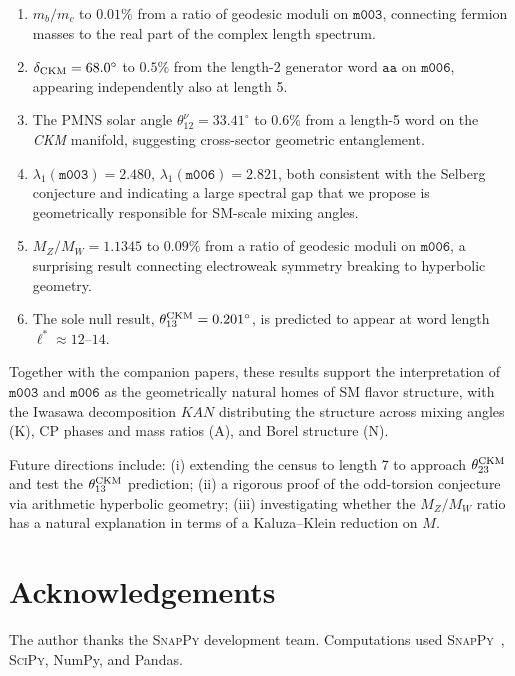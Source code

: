 \documentclass[11pt,a4paper]{article}
\newcommand{\mfld}[1]{\texttt{#1}}
\newcommand{\word}[1]{\texttt{#1}}
\newcommand{\degr}{^{\circ}}
\begin{document}
\begin{enumerate}
\item $m_b/m_c$ to $0.01\%$ from a ratio of geodesic moduli on $\mfld{m003}$,
      connecting fermion masses to the real part of the complex length spectrum.
\item $\delta_{\rm CKM}=68.0\degr$ to $0.5\%$ from the length-2 generator word
      $\word{aa}$ on $\mfld{m006}$, appearing independently also at length 5.
\item The PMNS solar angle $\theta_{12}^\nu=33.41\degr$ to $0.6\%$ from a
      length-5 word on the \emph{CKM} manifold, suggesting cross-sector
      geometric entanglement.
\item $\lambda_1(\mfld{m003})=2.480$, $\lambda_1(\mfld{m006})=2.821$,
      both consistent with the Selberg conjecture and indicating a large
      spectral gap that we propose is geometrically responsible for
      SM-scale mixing angles.
\item $M_Z/M_W=1.1345$ to $0.09\%$ from a ratio of geodesic moduli on
      $\mfld{m006}$, a surprising result connecting electroweak symmetry
      breaking to hyperbolic geometry.
\item The sole null result, $\theta_{13}^{\rm CKM}=0.201\degr$, is predicted
      to appear at word length $\ell^*\approx 12$--$14$.
\end{enumerate}

Together with the companion papers, these results support the interpretation
of $\mfld{m003}$ and $\mfld{m006}$ as the geometrically natural homes of SM
flavor structure, with the Iwasawa decomposition $KAN$ distributing the
structure across mixing angles (K), CP phases and mass ratios (A), and
Borel structure (N).

Future directions include: (i) extending the census to length 7 to approach
$\theta_{23}^{\rm CKM}$ and test the $\theta_{13}^{\rm CKM}$ prediction;
(ii) a rigorous proof of the odd-torsion conjecture via arithmetic hyperbolic
geometry; (iii) investigating whether the $M_Z/M_W$ ratio has a natural
explanation in terms of a Kaluza--Klein reduction on $M$.

\section*{Acknowledgements}
The author thanks the \textsc{SnapPy} development team.
Computations used \textsc{SnapPy}~\cite{SnapPy}, \textsc{SciPy}, NumPy,
and Pandas.
\end{document}
